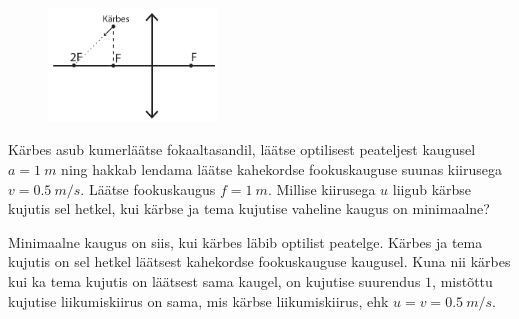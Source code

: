 
\begin{figure}
	\vspace{-30pt}
	\begin{center}
		\hspace{-20pt}
		\includegraphics[width = 0.4\textwidth]{2018-lahg-01-yl.pdf}
	\end{center}
\end{figure}
Kärbes asub kumerläätse fokaaltasandil, läätse optilisest peateljest kaugusel $a = \SI{1}{m}$ ning hakkab lendama läätse kahekordse fookuskauguse suunas kiirusega $v = \SI{0,5}{m/s}$. Läätse fookuskaugus $f = \SI{1}{m}$. Millise kiirusega $u$ liigub kärbse kujutis sel hetkel, kui kärbse ja tema kujutise vaheline kaugus on minimaalne?




\hint

\solu
Minimaalne kaugus on siis, kui kärbes läbib optilist peatelge. Kärbes ja tema kujutis on sel hetkel läätsest kahekordse fookuskauguse kaugusel. Kuna nii kärbes kui ka tema kujutis on läätsest sama kaugel, on kujutise suurendus $1$, mistõttu kujutise liikumiskiirus on sama, mis kärbse liikumiskiirus, ehk $u = v = \SI{0,5}{m/s}$.
\probend